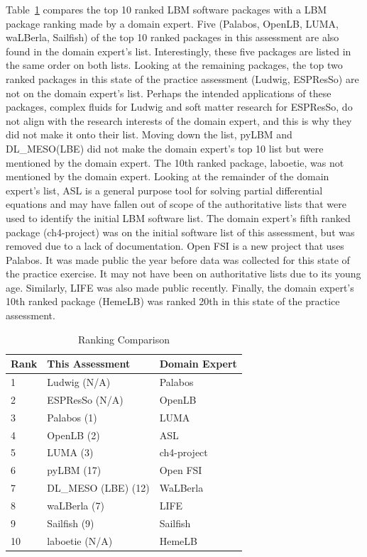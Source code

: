 \documentclass[final, 3p, times, authoryear]{elsarticle}
\begin{document}
Table~\ref{rankingcomparison} compares the top 10 ranked LBM software packages
with a LBM package ranking made by a domain expert. Five (Palabos, OpenLB, LUMA,
waLBerla, Sailfish) of the top 10 ranked packages in this assessment are also
found in the domain expert's list. Interestingly, these five packages are listed
in the same order on both lists. Looking at the remaining packages, the top two
ranked packages in this state of the practice assessment (Ludwig, ESPResSo) are
not on the domain expert's list. Perhaps the intended applications of these
packages, complex fluids for Ludwig and soft matter research for ESPResSo, do
not align with the research interests of the domain expert, and this is why they
did not make it onto their list. Moving down the list, pyLBM and DL\_MESO(LBE)
did not make the domain expert's top 10 list but were mentioned by the domain
expert. The 10th ranked package, laboetie, was not mentioned by the domain
expert. Looking at the remainder of the domain expert's list, ASL is a general
purpose tool for solving partial differential equations and may have fallen out
of scope of the authoritative lists that were used to identify the initial LBM
software list. The domain expert's fifth ranked package (ch4-project) was on the
initial software list of this assessment, but was removed due to a lack of
documentation. Open FSI is a new project that uses Palabos. It was made public
the year before data was collected for this state of the practice exercise. It
may not have been on authoritative lists due to its young age. Similarly, LIFE
was also made public recently. Finally, the domain expert's 10th ranked package
(HemeLB) was ranked 20th in this state of the practice assessment. 

\begin{table}
\begin{center}
		\begin{tabular}{ p{2cm}p{4.5cm}p{3.5cm}}
			\hline
			Rank & This Assessment & Domain Expert\\
			\hline
			1&Ludwig (N/A) &Palabos\\
			2&ESPResSo (N/A) &OpenLB\\
			3&Palabos (1)&LUMA\\
			4&OpenLB (2)&ASL\\
			5&LUMA (3)&ch4-project\\
			6&pyLBM (17)&Open FSI\\
			7&DL\_MESO (LBE) (12)& WaLBerla\\
			8&waLBerla (7)& LIFE\\
			9&Sailfish (9)&Sailfish\\
			10&laboetie (N/A)&HemeLB\\		
			\hline
		\end{tabular}
		\caption{Ranking Comparison} \label{rankingcomparison}
\end{center}
\end{table}
\end{document}
